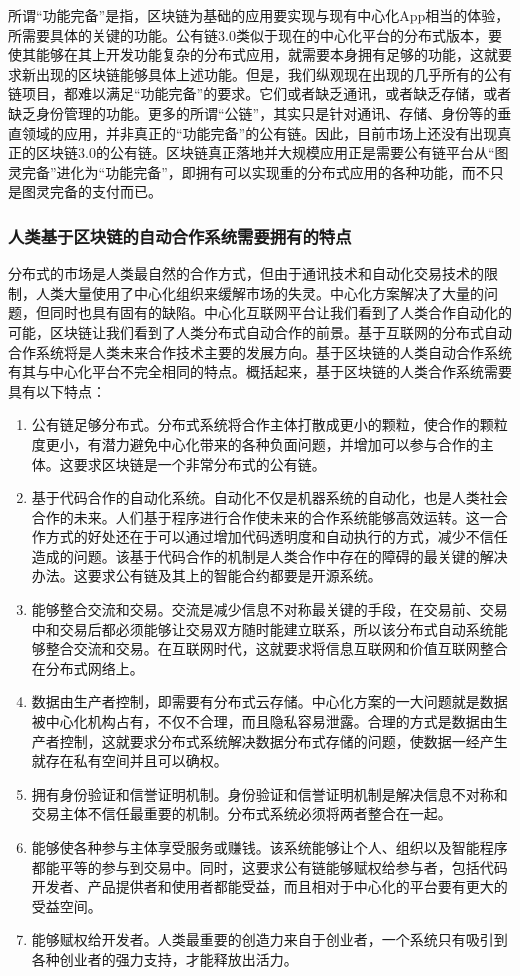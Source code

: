 \documentclass[a4paper,12pt]{article}
\begin{document}
所谓“功能完备”是指，区块链为基础的应用要实现与现有中心化App相当的体验，所需要具体的关键的功能。公有链3.0类似于现在的中心化平台的分布式版本，要使其能够在其上开发功能复杂的分布式应用，就需要本身拥有足够的功能，这就要求新出现的区块链能够具体上述功能。但是，我们纵观现在出现的几乎所有的公有链项目，都难以满足“功能完备”的要求。它们或者缺乏通讯，或者缺乏存储，或者缺乏身份管理的功能。更多的所谓“公链”，其实只是针对通讯、存储、身份等的垂直领域的应用，并非真正的“功能完备”的公有链。因此，目前市场上还没有出现真正的区块链3.0的公有链。区块链真正落地并大规模应用正是需要公有链平台从“图灵完备”进化为“功能完备”，即拥有可以实现重的分布式应用的各种功能，而不只是图灵完备的支付而已。

\subsubsection{人类基于区块链的自动合作系统需要拥有的特点}

分布式的市场是人类最自然的合作方式，但由于通讯技术和自动化交易技术的限制，人类大量使用了中心化组织来缓解市场的失灵。中心化方案解决了大量的问题，但同时也具有固有的缺陷。中心化互联网平台让我们看到了人类合作自动化的可能，区块链让我们看到了人类分布式自动合作的前景。基于互联网的分布式自动合作系统将是人类未来合作技术主要的发展方向。基于区块链的人类自动合作系统有其与中心化平台不完全相同的特点。概括起来，基于区块链的人类合作系统需要具有以下特点：

\begin{enumerate}
\item 公有链足够分布式。分布式系统将合作主体打散成更小的颗粒，使合作的颗粒度更小，有潜力避免中心化带来的各种负面问题，并增加可以参与合作的主体。这要求区块链是一个非常分布式的公有链。
\item 基于代码合作的自动化系统。自动化不仅是机器系统的自动化，也是人类社会合作的未来。人们基于程序进行合作使未来的合作系统能够高效运转。这一合作方式的好处还在于可以通过增加代码透明度和自动执行的方式，减少不信任造成的问题。该基于代码合作的机制是人类合作中存在的障碍的最关键的解决办法。这要求公有链及其上的智能合约都要是开源系统。
\item 能够整合交流和交易。交流是减少信息不对称最关键的手段，在交易前、交易中和交易后都必须能够让交易双方随时能建立联系，所以该分布式自动系统能够整合交流和交易。在互联网时代，这就要求将信息互联网和价值互联网整合在分布式网络上。
\item 数据由生产者控制，即需要有分布式云存储。中心化方案的一大问题就是数据被中心化机构占有，不仅不合理，而且隐私容易泄露。合理的方式是数据由生产者控制，这就要求分布式系统解决数据分布式存储的问题，使数据一经产生就存在私有空间并且可以确权。
\item 拥有身份验证和信誉证明机制。身份验证和信誉证明机制是解决信息不对称和交易主体不信任最重要的机制。分布式系统必须将两者整合在一起。
\item 能够使各种参与主体享受服务或赚钱。该系统能够让个人、组织以及智能程序都能平等的参与到交易中。同时，这要求公有链能够赋权给参与者，包括代码开发者、产品提供者和使用者都能受益，而且相对于中心化的平台要有更大的受益空间。
\item 能够赋权给开发者。人类最重要的创造力来自于创业者，一个系统只有吸引到各种创业者的强力支持，才能释放出活力。
\end{enumerate}
\end{document}
